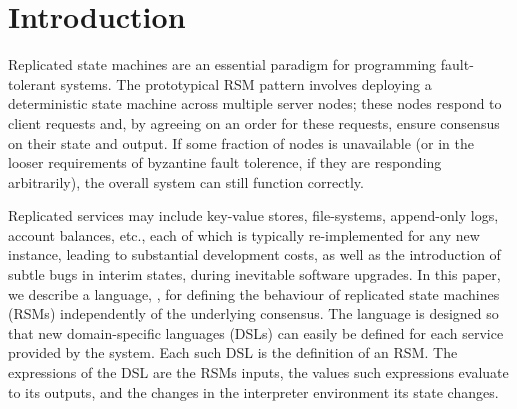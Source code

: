 \section{Introduction}
\label{s:introduction}







Replicated state machines are an essential paradigm for programming
fault-tolerant systems. The prototypical RSM pattern involves deploying a
deterministic state machine across multiple server nodes; these nodes respond
to client requests and, by agreeing on an order for these requests, ensure consensus
on their state and output. If some fraction of nodes is unavailable (or in the looser
requirements of byzantine fault tolerence, if they are responding arbitrarily),
the overall system can still function correctly.

Replicated services may include key-value stores, file-systems,
append-only logs, account balances, etc., each of which
is typically re-implemented for any new instance, leading to substantial development
costs, as well as the introduction of subtle bugs in interim states, during
inevitable software upgrades. In this paper, we describe a language, \rad{}, for
defining the behaviour of replicated state machines (RSMs) independently of the
underlying consensus. The language is designed so that new domain-specific
languages (DSLs) can easily be defined for each service provided by the system.
Each such DSL is the definition of an RSM. The expressions of the DSL
are the RSMs inputs, the values such expressions evaluate to its outputs, and
the changes in the interpreter environment its state changes.

